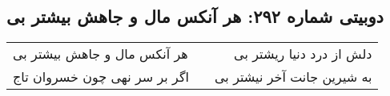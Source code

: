 \begin{center}
\section*{دوبیتی شماره ۲۹۲: هر آنکس مال و جاهش بیشتر بی}
\label{sec:292}
\begin{longtable}{l p{0.5cm} r}
هر آنکس مال و جاهش بیشتر بی
&&
دلش از درد دنیا ریشتر بی
\\
اگر بر سر نهی چون خسروان تاج
&&
به شیرین جانت آخر نیشتر بی
\\
\end{longtable}
\end{center}
